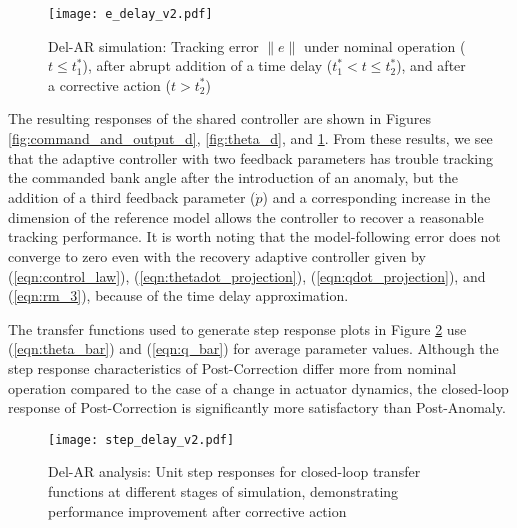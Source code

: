 \begin{figure}[h!]
	\centering
	\texttt{[image: e\_delay\_v2.pdf]}
	\caption{Del-AR simulation: Tracking error $\|e\|$ under nominal operation ($t \leq t_1^*$), after abrupt addition of a time delay ($t_1^* < t \leq t_2^*$), and after a corrective action ($t > t_2^*$)}
	\label{fig:error_d}
\end{figure}

The resulting responses of the shared controller are shown in Figures \ref{fig:command_and_output_d}, \ref{fig:theta_d}, and \ref{fig:error_d}. From these results, we see that the adaptive controller with two feedback parameters has trouble tracking the commanded bank angle after the introduction of an anomaly, but the addition of a third feedback parameter ($\hat{\dot{p}}$) and a corresponding increase in the dimension of the reference model allows the controller to recover a reasonable tracking performance. It is worth noting that the model-following error does not converge to zero even with the recovery adaptive controller given by (\ref{eqn:control_law}), (\ref{eqn:thetadot_projection}), (\ref{eqn:qdot_projection}), and (\ref{eqn:rm_3}), because of the time delay approximation. 

The transfer functions used to generate step response plots in Figure \ref{fig:step_delay} use (\ref{eqn:theta_bar}) and (\ref{eqn:q_bar}) for average parameter values. Although the step response characteristics of Post-Correction differ more from nominal operation compared to the case of a change in actuator dynamics, the closed-loop response of Post-Correction is significantly more satisfactory than Post-Anomaly.

\begin{figure}[h!]
	\centering
	\texttt{[image: step\_delay\_v2.pdf]}
	\caption{Del-AR analysis: Unit step responses for closed-loop transfer functions at different stages of simulation, demonstrating performance improvement after corrective action}
	\label{fig:step_delay}
\end{figure}
\clearpage

